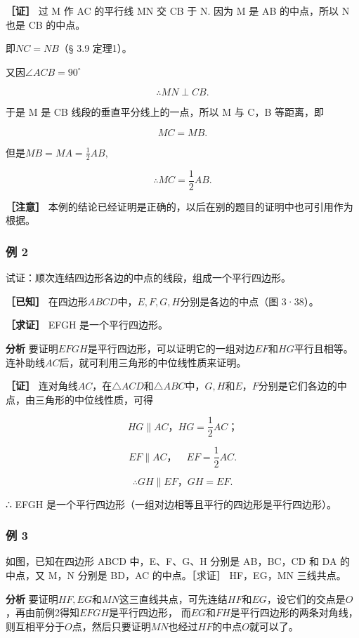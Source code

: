 \textbf{［证］} 过 M 作 AC 的平行线 MN 交 CB 于 N. 因为 M 是 AB
的中点，所以 N 也是 CB 的中点。

即\(NC = NB\)（§ 3.9 定理1）。

又因\(\angle ACB = 90^{\circ}\)

\[
\therefore MN \perp CB.
\]

于是 M 是 CB 线段的垂直平分线上的一点，所以 M 与 C，B 等距离，即

\[
MC = MB.
\]

但是\(MB = MA = \frac{1}{2} AB,\)

\[
\therefore MC = \frac{1}{2} AB.
\]

\textbf{［注意］}
本例的结论已经证明是正确的，以后在别的题目的证明中也可引用作为根据。

\subsubsection{例 2}

试证：顺次连结四边形各边的中点的线段，组成一个平行四边形。

\textbf{［已知］} 在四边形\(ABCD\)中，\(E, F, G, H\)分别是各边的中点（图
3·38）。

\textbf{［求证］} EFGH 是一个平行四边形。

\textbf{分析}
要证明\(EFGH\)是平行四边形，可以证明它的一组对边\(EF\)和\(HG\)平行且相等。连补助线\(AC\)后，就可利用三角形的中位线性质来证明。

\textbf{［证］}
连对角线\(AC\)，在\(\triangle ACD\)和\(\triangle ABC\)中，\(G, H\)和\(E\)，\(F\)分别是它们各边的中点，由三角形的中位线性质，可得

\[
HG \parallel AC\text{，} HG = \frac{1}{2} AC\text{；}
\]

\[
EF \parallel AC\text{，} \quad EF = \frac{1}{2} AC.
\]

\[
\therefore GH \parallel EF\text{，} GH = EF.
\]

∴ EFGH 是一个平行四边形（一组对边相等且平行的四边形是平行四边形）。

\subsubsection{例 3}

如图，已知在四边形 ABCD 中，E、F、G、H 分别是 AB，BC，CD 和 DA
的中点，又 M，N 分别是 BD，AC 的中点。［求证］ HF，EG，MN 三线共点。

\textbf{分析}
要证明\(HF, EG\)和\(MN\)这三直线共点，可先连结\(HF\)和\(EG\)，设它们的交点是\(O\)，再由前例2得知\(EFGH\)是平行四边形，
而\(EG\)和\(FH\)是平行四边形的两条对角线，则互相平分于\(O\)点，然后只要证明\(MN\)也经过\(HF\)的中点\(O\)就可以了。

